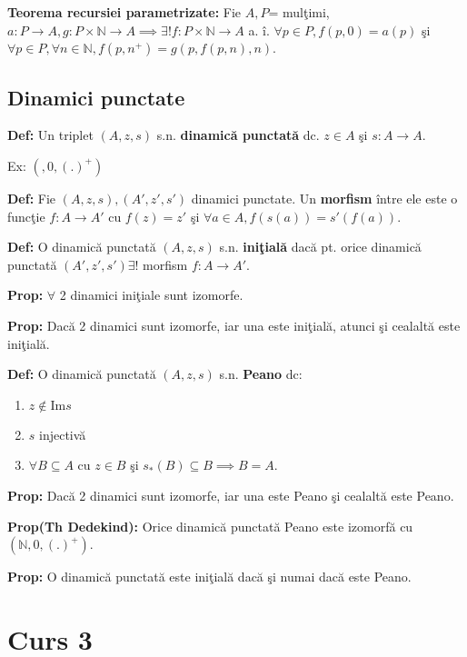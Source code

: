 \documentclass{article}
\begin{document}
\textbf{Teorema recursiei parametrizate:} Fie $A,P$= mul\c timi, $a:P \rightarrow A, g:P\times \mathbb N \rightarrow A \implies \exists ! f:P\times \mathbb N \rightarrow A$ a. \^ i. $\forall p\in P, f(p,0)=a(p)$ \c si $\forall p\in P, \forall n\in \mathbb N, f(p,n^+)=g(p,f(p,n),n)$.

\subsection{Dinamici punctate}

\textbf{Def:} Un triplet $(A,z,s)$ s.n. \textbf{dinamic\u a punctat\u a} dc. $z \in A$ \c si $s:A\rightarrow A$.

Ex: $(\mathbb,0,(.)^+)$

\textbf{Def:} Fie $(A,z,s),(A',z',s')$ dinamici punctate. Un \textbf{morfism} \^ intre ele este o func\c tie $f:A\rightarrow A'$ cu $f(z)=z'$ \c si $\forall a \in A, f(s(a))=s'(f(a))$.

\textbf{Def:} O dinamic\u a punctat\u a $(A,z,s)$ s.n. \textbf{ini\c tial\u a} dac\u a pt. orice dinamic\u a punctat\u a $(A',z',s') \exists !$ morfism $f:A \rightarrow A'$.

\textbf{Prop:} $\forall$ 2 dinamici ini\c tiale sunt izomorfe.

\textbf{Prop:} Dac\u a 2 dinamici sunt izomorfe, iar una este ini\c tial\u a, atunci \c si cealalt\u a este ini\c tial\u a.

\textbf{Def:} O dinamic\u a punctat\u a $(A,z,s)$ s.n. \textbf{Peano} dc:
\begin{enumerate}
    \item $z \notin \text{Im}s$
    \item $s$ injectiv\u a
    \item $\forall B\subseteq A$ cu $z\in B$ \c si $s_*(B)\subseteq B \implies B=A$.
\end{enumerate}

\textbf{Prop:} Dac\u a 2 dinamici sunt izomorfe, iar una este Peano \c si cealalt\u a este Peano.

\textbf{Prop(Th Dedekind):} Orice dinamic\u a punctat\u a Peano este izomorf\u a cu $(\mathbb N, 0, (.)^+)$.

\textbf{Prop:} O dinamic\u a punctat\u a este ini\c tial\u a dac\u a \c si numai dac\u a este Peano.

\section{Curs 3}
\end{document}
